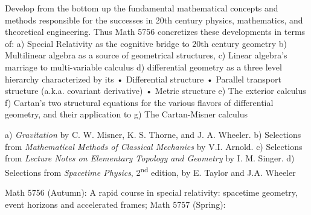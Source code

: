 \documentclass{osucourse}
\begin{document}
\CatalogDescription
\PrerequisitesAndExclusions

\begin{Purpose}
Develop from the bottom up the fundamental mathematical concepts and methods responsible for the successes in 20th century physics, mathematics, and theoretical engineering. Thus Math 5756 concretizes these developments in terms of: a) Special Relativity as the cognitive bridge to 20th century geometry b) Multilinear algebra as a source of geometrical structures, c) Linear algebra’s marriage to multi-variable calculus d) differential geometry as a three level hierarchy characterized by its • Differential structure • Parallel transport structure (a.k.a. covariant derivative) • Metric structure e) The exterior calculus f) Cartan’s two structural equations for the various flavors of differential geometry, and their application to g) The Cartan-Misner calculus
\end{Purpose}

\begin{Text}
a) \emph{Gravitation} by C. W. Misner, K. S. Thorne, and J. A. Wheeler. b) Selections from \emph{Mathematical Methods of Classical Mechanics} by V.I. Arnold. c) Selections from \emph{Lecture Notes on Elementary Topology and Geometry} by I. M. Singer. d) Selections from \emph{Spacetime Physics}, 2\textsuperscript{nd} edition, by E. Taylor and J.A. Wheeler
\end{Text}

\begin{TopicsOutline}
Math 5756 (Autumn):
A rapid course in special relativity: spacetime geometry, event horizons and accelerated frames;
Math 5757 (Spring):
\end{TopicsOutline}
\end{document}
